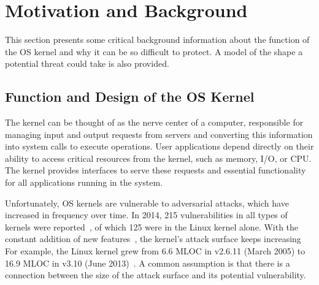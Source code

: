 \section{Motivation and Background}
\label{sec.motivation-and-background}

This section presents some critical background information
about the function of the OS kernel and why it can be so difficult to protect.
A model of the shape a potential threat could take is also provided.

\subsection{Function and Design of the OS Kernel}

The kernel can be thought of as the nerve center of a computer, responsible for
managing input and output requests from servers and converting this information
into system calls to execute operations. User applications depend directly on
their ability to access critical resources from the kernel, such as memory, I/O, or CPU.
The kernel provides interfaces to serve these requests and essential functionality
 for all applications running in the system.

Unfortunately, OS kernels are vulnerable to adversarial attacks, which have
increased in frequency over time.
In 2014, 215 vulnerabilities in all types of kernels were reported~\cite{NVD},
of which 125 were in the Linux kernel alone.
With the constant addition of new features~\cite{Metrics-13}, the kernel's
attack surface keeps increasing For example, the Linux kernel grew from 6.6 MLOC
in v2.6.11 (March 2005) to 16.9 MLOC in v3.10 (June 2013)~\cite{Linux-13}. A
common assumption is that there is a connection between the size of the attack surface and
its potential vulnerability. 


